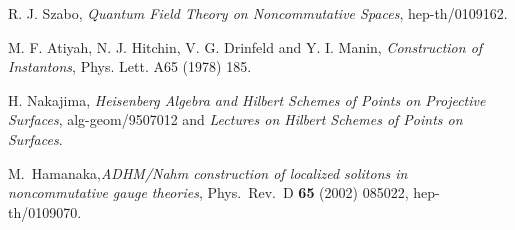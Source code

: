 \documentclass[a4paper,a4paper]{article}
\begin{document}
\begin{thebibliography}{99}
 R. J. Szabo, {\it Quantum Field Theory on
Noncommutative Spaces}, hep-th/0109162.

 M. F. Atiyah, N. J. Hitchin, V. G. Drinfeld and Y.
I. Manin, {\it Construction of Instantons}, Phys. Lett. A65 (1978)
185.

 H. Nakajima, {\it Heisenberg Algebra and Hilbert
Schemes of Points on Projective Surfaces}, alg-geom/9507012 and
{\it Lectures on Hilbert Schemes of Points on Surfaces}.

 M.~Hamanaka,{\it ADHM/Nahm construction of localized solitons
in noncommutative gauge theories}, Phys.\ Rev.\ D {\bf 65} (2002)
085022, hep-th/0109070.

\end{thebibliography}
\end{document}
